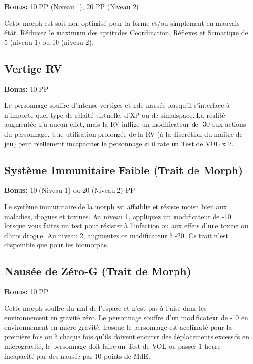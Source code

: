 \textbf{Bonus:} 10 PP (Niveau 1), 20 PP (Niveau 2) 

Cette morph est soit non optimisé pour la forme et/ou simplement en mauvais étât. Réduisez le maximum des aptitudes Coordination, Réflexes et Somatique de 5 (niveau 1) ou 10 (niveau 2). 

\subsection{Vertige RV} \label{sec:traits-vr-vertigo} 

\textbf{Bonus:} 10 PP 

Le personnage souffre d'intense vertiges et nde nausée lorsqu'il s'interface à n'importe quel type de rélaité virtuelle, d'XP ou de simulspace. La réalité augmentée n'a aucun effet, mais la RV inflige un modificateur de -30 aux actions du personnage. Une utilisation prolongée de la RV (à la discrétion du maître de jeu) peut réellement incapaciter le personnage si il rate un Test de VOL x 2. 

\subsection{Système Immunitaire Faible (Trait de Morph)} \label{sec:traits-weak-immune-system} 

\textbf{Bonus:} 10 (Niveau 1) ou 20 (Niveau 2) PP 

Le système immunitaire de la morph est affaiblie et résiste moisn bien aux maladies, drogues et toxines. Au niveau 1, appliquez un modificateur de -10 lorsque vous faites un test pour résister à l'infection ou aux effets d'une toxine ou d'une drogue. Au niveau 2, augmentez ce modificateur à -20. Ce trait n'est disponible que pour les biomorphs. 

\subsection{Nausée de Zéro-G (Trait de Morph)} \label{sec:traits-zero-g-nausea} 

\textbf{Bonus:} 10 PP 

Cette morph souffre du mal de l'espace et n'est pas à l'aise dans les environnement en gravité zéro. Le personnage souffre d'un modificateur de -10 en environnement en micro-gravité. lrosque le personnage est acclimaté pour la première fois ou à chaque fois qu'ils doivent encurer des déplacements excessifs en microgravité, le personnage doit faire un Test de VOL ou passer 1 heure incapacité par des nausée par 10 points de MdE. 


